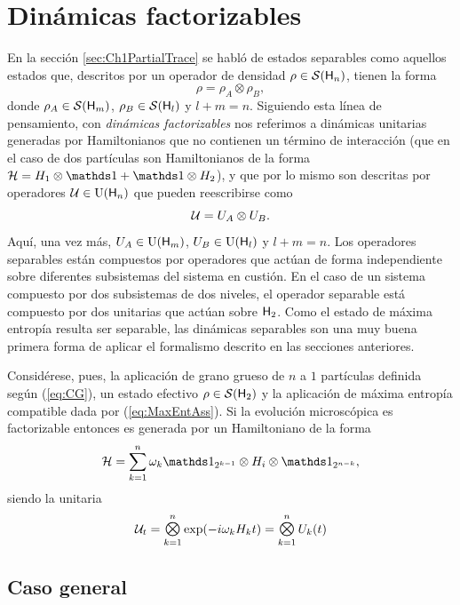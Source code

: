 \section{Dinámicas factorizables}

En la sección \ref{sec:Ch1PartialTrace} se habló de estados separables como aquellos estados que, descritos por un operador de densidad $\rho\in\mathcal{S}({\sf H}_{n})$, tienen la forma
\begin{equation*}
    \rho=\rho_{A}\otimes\rho_{B},
\end{equation*}
donde $\rho_{A}\in\mathcal{S}({\sf H}_{m})$, $\rho_{B}\in\mathcal{S}({\sf H}_{l})$ y $l+m=n$. Siguiendo esta línea de pensamiento, con \textit{dinámicas factorizables} nos referimos a dinámicas unitarias generadas por Hamiltonianos que no contienen un término de interacción (que en el caso de dos partículas son Hamiltonianos de la forma $\mcH=H_{1}\otimes\Id+\Id\otimes H_{2}$), y que por lo mismo son descritas por operadores $\mathcal{U}\in\text{U}({\sf H}_{n})$ que pueden reescribirse como
\begin{equation*}
    \mathcal{U}=U_{A}\otimes U_{B}.
\end{equation*}
Aquí, una vez más, $U_{A}\in\text{U}({\sf H}_{m})$, $U_{B}\in\text{U}({\sf H}_{l})$ y $l+m=n$. Los operadores separables están compuestos por operadores que actúan de forma independiente sobre diferentes subsistemas del sistema en custión. En el caso de un sistema compuesto por dos subsistemas de dos niveles, el operador separable está compuesto por dos unitarias que actúan sobre ${\sf H}_{2}$. Como el estado de máxima entropía resulta ser separable, las dinámicas separables son una muy buena primera forma de aplicar el formalismo descrito en las secciones anteriores.

Considérese, pues, la aplicación de grano grueso de $n$ a $1$ partículas definida según (\ref{eq:CG}), un estado efectivo $\rho\in\mathcal{S}({\sf H}_{2})$ y la aplicación de máxima entropía compatible dada por (\ref{eq:MaxEntAss}). Si la evolución microscópica es factorizable entonces es generada por un Hamiltoniano de la forma
\begin{equation*}
    \mcH=\sum_{k=1}^{n}\omega_{k}\Id_{2^{k-1}}\otimes H_{i} \otimes \Id_{2^{n-k}},
\end{equation*}
siendo la unitaria 
\begin{equation}\label{eq:NFactorUnitaries}
    \mcU_{t}=\Motimes_{k=1}^{n}\text{exp}\qty(-i\omega_{k}H_{k}t)=\Motimes_{k=1}^{n} U_{k}(t)
\end{equation}


\subsection{Caso general}

